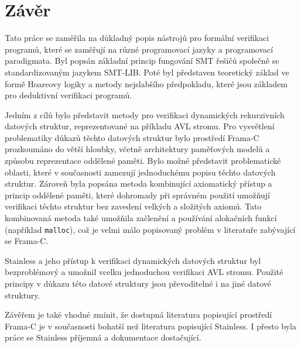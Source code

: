 \chapter*{Závěr}

Tato práce se zaměřila na důkladný popis nástrojů pro formální verifikaci programů,
které se zaměřují na různé programovací jazyky a programovací paradigmata.
Byl popsán základní princip fungování SMT řešičů společně se standardizovaným jazykem SMT-LIB\@.
Poté byl představen teoretický základ ve formě Hoareovy logiky a metody nejslabšího předpokladu,
které jsou základem pro deduktivní verifikaci programů.

Jedním z cílů bylo představit metody pro verifikaci dynamických rekurzivních datových struktur,
reprezentované na příkladu AVL stromu.
Pro vysvětlení problematiky důkazů těchto datových struktur
bylo prostředí Frama\mbox{-}C prozkoumáno do větší hloubky,
včetně architektury paměťových modelů a způsobu reprezentace oddělené paměti.
Bylo možné představit problematické oblasti,
které v současnosti zamezují jednoduchému popisu těchto datových struktur.
Zároveň byla popsána metoda kombinující axiomatický přístup a princip oddělené paměti,
které dohromady při správném použití umožňují verifikaci těchto struktur
bez zavedení velkých a složitých axiomů.
Tato kombinovaná metoda také umožňila začlenění a používání alokačních funkcí (například \texttt{malloc}),
což je velmi málo popisovaný problém v literatuře zabývající se Frama\mbox{-}C\@.

Stainless a jeho přístup k verifikaci dynamických datových struktur
byl bezproblémový a umožnil vcelku jednoduchou verifikaci AVL stromu.
Použité principy v důkazu této datové struktury jsou převoditelné
i na jiné datové struktury.

Závěřem je také vhodné zmínit, že dostupná literatura popisující prostředí Frama\mbox{-}C
je v současnosti bohatší než literatura popisující Stainless.
I přesto byla práce se Stainless příjemná a dokumentace dostačující.
